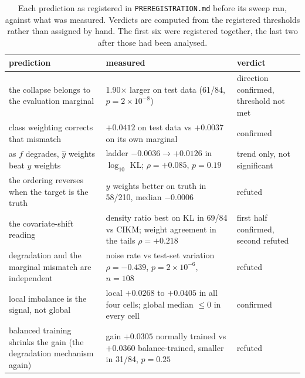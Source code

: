 \begin{table}[H]
  \centering
  \footnotesize
  \setlength{\tabcolsep}{4pt}
  \caption{Each prediction as registered in \texttt{PREREGISTRATION.md} before its sweep ran, against what was measured. Verdicts are computed from the registered thresholds rather than assigned by hand. The first six were registered together, the last two after those had been analysed.}
  \label{tab:predictions}
  \setlength{\tabcolsep}{3pt}
  \begin{tabular}{p{} p{} l}
    \toprule
    prediction & measured & verdict \\
    \midrule
    the collapse belongs to the evaluation marginal & 1.90$\times$ larger on test data (61/84, $p = 2\times10^{-8}$) & direction confirmed, threshold not met \\
    class weighting corrects that mismatch & $+0.0412$ on test data vs $+0.0037$ on its own marginal & confirmed \\
    as $f$ degrades, $\hat{y}$ weights beat $y$ weights & ladder $-0.0036 \to +0.0126$ in $\log_{10}$ KL; $\rho = +0.085$, $p = 0.19$ & trend only, not significant \\
    the ordering reverses when the target is the truth & $y$ weights better on truth in 58/210, median $-0.0006$ & refuted \\
    the covariate-shift reading & density ratio best on KL in 69/84 vs CIKM; weight agreement in the tails $\rho = +0.218$ & first half confirmed, second refuted \\
    degradation and the marginal mismatch are independent & noise rate vs test-set variation $\rho = -0.439$, $p = 2\times10^{-6}$, $n = 108$ & refuted \\
    local imbalance is the signal, not global & local $+0.0268$ to $+0.0405$ in all four cells; global median $\leq 0$ in every cell & confirmed \\
    balanced training shrinks the gain (the degradation mechanism again) & gain $+0.0305$ normally trained vs $+0.0360$ balance-trained, smaller in 31/84, $p = 0.25$ & refuted \\
    \bottomrule
  \end{tabular}
\end{table}
